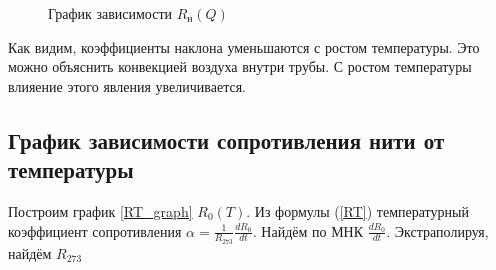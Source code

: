 \documentclass[a4paper, 12pt]{article}
\begin{document}
            \begin{figure}[ht]
                \caption{График зависимости $R_н(Q)$}
                \label{RQ_graph}
            \end{figure}

            Как видим, коэффициенты наклона уменьшаются с ростом температуры. Это можно объяснить конвекцией воздуха внутри трубы. С ростом температуры влияение этого явления увеличивается.

        \subsection{График зависимости сопротивления нити от температуры}

            Построим график \ref{RT_graph} $R_0(T)$. Из формулы (\ref{RT}) температурный коэффициент сопротивления $\alpha = \frac{1}{R_{273}}\frac{dR_0}{dt}$. Найдём по МНК $\frac{dR_0}{dt}$. Экстраполируя, найдём $R_{273}$
\end{document}
